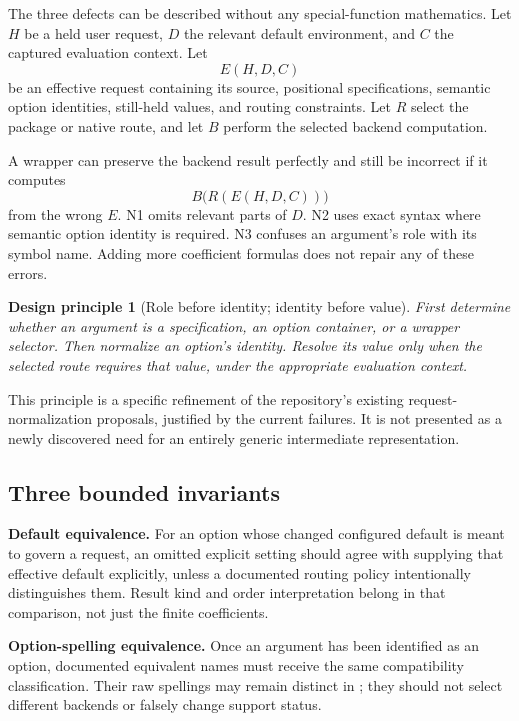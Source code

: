 \documentclass[11pt,a4paper]{article}
\newcommand{\code}[1]{\texttt{\detokenize{#1}}}
\newtheorem{principle}{Design principle}
\begin{document}
The three defects can be described without any special-function mathematics. Let \(H\) be a held user request, \(D\) the relevant default environment, and \(C\) the captured evaluation context. Let
\[
 E(H,D,C)
\]
be an effective request containing its source, positional specifications, semantic option identities, still-held values, and routing constraints. Let \(R\) select the package or native route, and let \(B\) perform the selected backend computation.

A wrapper can preserve the backend result perfectly and still be incorrect if it computes
\[
 B\bigl(R(E(H,D,C))\bigr)
\]
from the wrong \(E\). N1 omits relevant parts of \(D\). N2 uses exact syntax where semantic option identity is required. N3 confuses an argument's role with its symbol name. Adding more coefficient formulas does not repair any of these errors.

\begin{principle}[Role before identity; identity before value]
First determine whether an argument is a specification, an option container, or a wrapper selector. Then normalize an option's identity. Resolve its value only when the selected route requires that value, under the appropriate evaluation context.
\end{principle}

This principle is a specific refinement of the repository's existing request-normalization proposals, justified by the current failures. It is not presented as a newly discovered need for an entirely generic intermediate representation.

\subsection{Three bounded invariants}

\textbf{Default equivalence.} For an option whose changed configured default is meant to govern a request, an omitted explicit setting should agree with supplying that effective default explicitly, unless a documented routing policy intentionally distinguishes them. Result kind and order interpretation belong in that comparison, not just the finite coefficients.

\textbf{Option-spelling equivalence.} Once an argument has been identified as an option, documented equivalent names must receive the same compatibility classification. Their raw spellings may remain distinct in \code{OriginalArguments}; they should not select different backends or falsely change support status.
\end{document}
